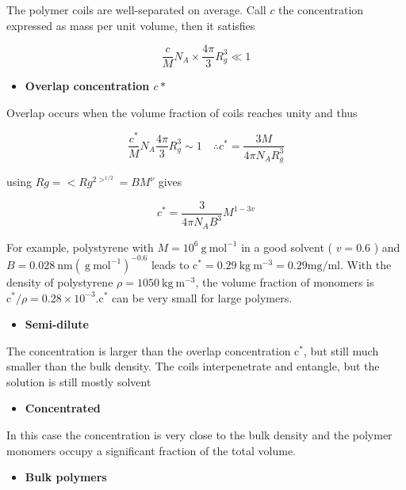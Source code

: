\documentclass[
  letterpaper,
  enabledeprecatedfontcommands]{report}
\providecommand{\tightlist}{%
  \setlength{\itemsep}{0pt}\setlength{\parskip}{0pt}}
\begin{document}
The polymer coils are well-separated on average. Call \(c\) the
concentration expressed as mass per unit volume, then it satisfies

\[ \dfrac{c}{M}N_A \times \dfrac{4\pi}{3}R_g^3\ll 1\]

\begin{itemize}
\tightlist
\item
  \textbf{Overlap concentration \(c*\)}
\end{itemize}

Overlap occurs when the volume fraction of coils reaches unity and thus

\[
\frac{c^{*}}{M} N_{A} \frac{4 \pi}{3} R_{g}^{3} \sim 1 \quad \therefore c^{*}=\frac{3 M}{4 \pi N_{A} R_{g}^{3}}
\]

using \(R g=<R g^{2>^{1 / 2}}=B M^{\nu}\) gives

\[
c^{*}=\frac{3}{4 \pi N_{A} B^{3}} M^{1-3 v}
\]

For example, polystyrene with
\(M=10^{6} \mathrm{~g} \mathrm{~mol}^{-1}\) in a good solvent (
\(v=0.6\) ) and
\(B=0.028 \mathrm{~nm}\left(\mathrm{~g} \mathrm{~mol}^{-1}\right)^{-0.6}\)
leads to
\(\mathrm{c}^{*}=0.29 \mathrm{~kg} \mathrm{~m}^{-3}=0.29 \mathrm{mg} / \mathrm{ml}\).
With the density of polystyrene
\(\rho=1050 \mathrm{~kg} \mathrm{~m}^{-3}\), the volume fraction of
monomers is
\(\mathrm{c}^{*} / \rho=0.28 \times 10^{-3} . \mathrm{c}^{*}\) can be
very small for large polymers.

\begin{itemize}
\tightlist
\item
  \textbf{Semi-dilute}
\end{itemize}

The concentration is larger than the overlap concentration
\(\mathrm{c}^{*}\), but still much smaller than the bulk density. The
coils interpenetrate and entangle, but the solution is still mostly
solvent

\begin{itemize}
\tightlist
\item
  \textbf{Concentrated}
\end{itemize}

In this case the concentration is very close to the bulk density and the
polymer monomers occupy a significant fraction of the total volume.

\begin{itemize}
\tightlist
\item
  \textbf{Bulk polymers}
\end{itemize}
\end{document}
